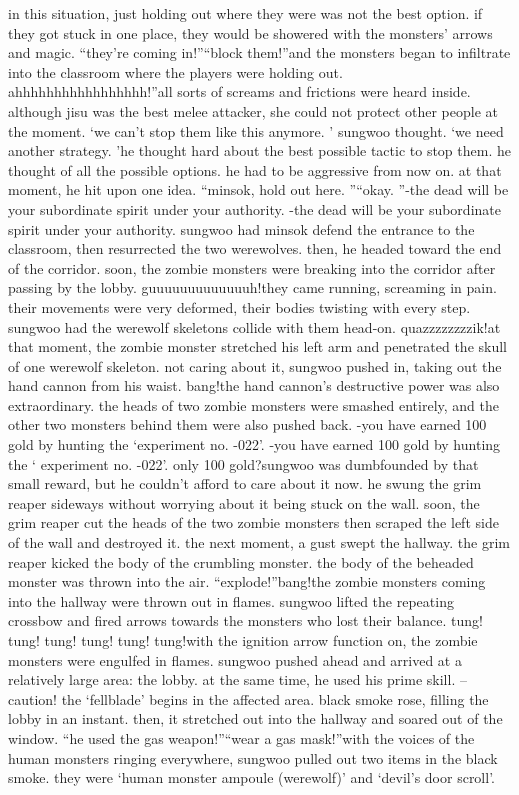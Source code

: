  in this situation, just holding out where they were was not the best option.
 if they got stuck in one place, they would be showered with the monsters’ arrows and magic.
“they’re coming in!”“block them!”and the monsters began to infiltrate into the classroom where the players were holding out.
ahhhhhhhhhhhhhhhhh!”all sorts of screams and frictions were heard inside.
 although jisu was the best melee attacker, she could not protect other people at the moment.
‘we can’t stop them like this anymore.
’ sungwoo thought.
 ‘we need another strategy.
’he thought hard about the best possible tactic to stop them.
 he thought of all the possible options.
 he had to be aggressive from now on.
at that moment, he hit upon one idea.
“minsok, hold out here.
”“okay.
”-the dead will be your subordinate spirit under your authority.
-the dead will be your subordinate spirit under your authority.
sungwoo had minsok defend the entrance to the classroom, then resurrected the two werewolves.
 then, he headed toward the end of the corridor.
 soon, the zombie monsters were breaking into the corridor after passing by the lobby.
guuuuuuuuuuuuuh!they came running, screaming in pain.
 their movements were very deformed, their bodies twisting with every step.
sungwoo had the werewolf skeletons collide with them head-on.
quazzzzzzzzik!at that moment, the zombie monster stretched his left arm and penetrated the skull of one werewolf skeleton.
 not caring about it, sungwoo pushed in, taking out the hand cannon from his waist.
bang!the hand cannon’s destructive power was also extraordinary.
 the heads of two zombie monsters were smashed entirely, and the other two monsters behind them were also pushed back.
-you have earned 100 gold by hunting the ‘experiment no.
-022’.
-you have earned 100 gold by hunting the ‘ experiment no.
-022’.
only 100 gold?sungwoo was dumbfounded by that small reward, but he couldn’t afford to care about it now.
he swung the grim reaper sideways without worrying about it being stuck on the wall.
soon, the grim reaper cut the heads of the two zombie monsters then scraped the left side of the wall and destroyed it.
 the next moment, a gust swept the hallway.
 the grim reaper kicked the body of the crumbling monster.
 the body of the beheaded monster was thrown into the air.
“explode!”bang!the zombie monsters coming into the hallway were thrown out in flames.
 sungwoo lifted the repeating crossbow and fired arrows towards the monsters who lost their balance.
tung! tung! tung! tung! tung! tung!with the ignition arrow function on, the zombie monsters were engulfed in flames.
sungwoo pushed ahead and arrived at a relatively large area: the lobby.
at the same time, he used his prime skill.
– caution! the ‘fellblade’ begins in the affected area.
black smoke rose, filling the lobby in an instant.
 then, it stretched out into the hallway and soared out of the window.
“he used the gas weapon!”“wear a gas mask!”with the voices of the human monsters ringing everywhere, sungwoo pulled out two items in the black smoke.
 they were ‘human monster ampoule (werewolf)’ and ‘devil’s door scroll’.


